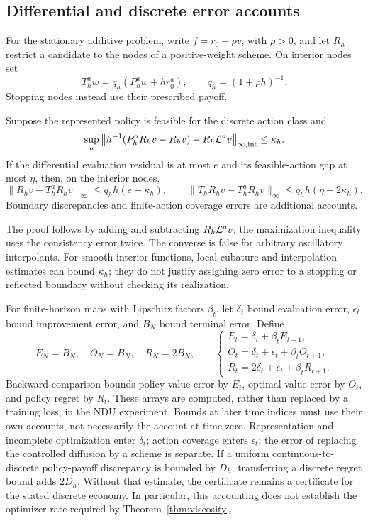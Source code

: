 \subsection{Differential and discrete error accounts}\label{sec:bridge-r6}
For the stationary additive problem, write $f=r_0-\rho v$, with $\rho>0$, and let $R_h$ restrict a candidate to the nodes of a positive-weight scheme. On interior nodes set
\[
 T_h^a w=q_h(P_h^aw+h r_0^a),\qquad q_h=(1+\rho h)^{-1}.
\]
Stopping nodes instead use their prescribed payoff.
\begin{proposition}\label{prop:bridge-r6}
Suppose the represented policy is feasible for the discrete action class and
\[
 \sup_a\left\|h^{-1}(P_h^aR_hv-R_hv)-R_h\mathcal L^av\right\|_{\infty,\mathrm{int}}\leq\kappa_h.
\]
If the differential evaluation residual is at most $e$ and its feasible-action gap at most $\eta$, then, on the interior nodes,
\[
 \|R_hv-T_h^aR_hv\|_\infty\leq q_hh(e+\kappa_h),\qquad
 \|T_hR_hv-T_h^aR_hv\|_\infty\leq q_hh(\eta+2\kappa_h).
\]
Boundary discrepancies and finite-action coverage errors are additional accounts.
\end{proposition}
The proof follows by adding and subtracting $R_h\mathcal L^av$; the maximization inequality uses the consistency error twice. The converse is false for arbitrary oscillatory interpolants. For smooth interior functions, local cubature and interpolation estimates can bound $\kappa_h$; they do not justify assigning zero error to a stopping or reflected boundary without checking its realization.

For finite-horizon maps with Lipschitz factors $\beta_t$, let $\delta_t$ bound evaluation error, $\epsilon_t$ bound improvement error, and $B_N$ bound terminal error. Define
\begin{equation}\label{eq:accounts-r6}
 E_N=B_N,\quad O_N=B_N,\quad R_N=2B_N,\qquad
 \begin{cases}
 E_t=\delta_t+\beta_t E_{t+1},\\
 O_t=\delta_t+\epsilon_t+\beta_t O_{t+1},\\
 R_t=2\delta_t+\epsilon_t+\beta_t R_{t+1}.
 \end{cases}
\end{equation}
Backward comparison bounds policy-value error by $E_t$, optimal-value error by $O_t$, and policy regret by $R_t$. These arrays are computed, rather than replaced by a training loss, in the NDU experiment. Bounds at later time indices must use their own accounts, not necessarily the account at time zero. Representation and incomplete optimization enter $\delta_t$; action coverage enters $\epsilon_t$; the error of replacing the controlled diffusion by a scheme is separate. If a uniform continuous-to-discrete policy-payoff discrepancy is bounded by $D_h$, transferring a discrete regret bound adds $2D_h$. Without that estimate, the certificate remains a certificate for the stated discrete economy. In particular, this accounting does not establish the optimizer rate required by Theorem~\ref{thm:viscosity}.
